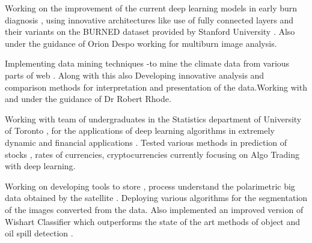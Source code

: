 \documentclass[]{deedy-resume-openfont}
\begin{document}
\sectionsep

Working on the improvement of the current deep learning models in early burn diagnosis , using innovative architectures like use of fully connected layers and their variants on the BURNED dataset provided by Stanford University .  Also under the guidance of Orion Despo working for multiburn image analysis.
\sectionsep

Implementing  data mining techniques -to mine the climate data from various parts of web . Along with this also Developing innovative analysis and comparison methods for interpretation and presentation of the data.Working with and under the guidance of Dr Robert Rhode.
\sectionsep

Working with team of  undergraduates in the Statistics department of University of Toronto , for the applications of deep learning algorithms in extremely dynamic and financial applications . Tested various methods in prediction of stocks , rates of currencies, cryptocurrencies currently focusing on Algo Trading with deep learning.
\sectionsep

Working on developing tools to store , process understand the polarimetric big data obtained by the satellite . Deploying various algorithms for the segmentation of the images converted from the data. Also implemented an improved version of Wishart Classifier which outperforms the state of the art methods of object and oil spill detection .
\sectionsep
\end{document}
